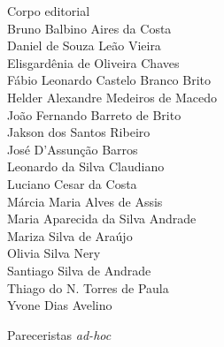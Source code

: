 {\begin{minipage}[t]{.5\textwidth}
\raggedright
Corpo editorial\\
\hspace{1.5em}Bruno Balbino Aires da Costa\\
\hspace{1.5em}Daniel de Souza Leão Vieira\\
\hspace{1.5em}Elisgardênia de Oliveira Chaves\\
\hspace{1.5em}Fábio Leonardo Castelo Branco Brito\\
\hspace{1.5em}Helder Alexandre Medeiros de Macedo\\
\hspace{1.5em}João Fernando Barreto de Brito\\
\hspace{1.5em}Jakson dos Santos Ribeiro\\
\hspace{1.5em}José D'Assunção Barros\\
\hspace{1.5em}Leonardo da Silva Claudiano\\
\hspace{1.5em}Luciano Cesar da Costa\\
\hspace{1.5em}Márcia Maria Alves de Assis\\
\hspace{1.5em}Maria Aparecida da Silva Andrade\\
\hspace{1.5em}Mariza Silva de Araújo\\
\hspace{1.5em}Olivia Silva Nery\\
\hspace{1.5em}Santiago Silva de Andrade\\
\hspace{1.5em}Thiago do N. Torres de Paula\\
\hspace{1.5em}Yvone Dias Avelino
\end{minipage}%
\begin{minipage}[t]{.5\textwidth}
\raggedright
Pareceristas \textit{ad-hoc}\\

\end{minipage}}
